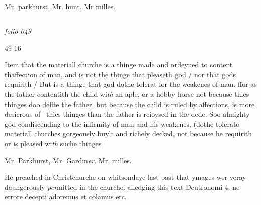 \documentclass[12pt, a4paper]{book}
\begin{document}
               		
				\marginpar[\vspace{0.5cm}{\textcolor{Gray}{n}}]{}
			
               		
		\ifthenelse{\isodd{\thepage}}
		{\reversemarginpar}
		{\normalmarginpar}
		Mr. parkhurst. Mr. hunt. Mr milles.



\dotfill
						\newpage {} \subsection*{}

\textit{folio 049}


\begin{flushright}{\color{Mahogany}49} 16\end{flushright}
	
		
				\marginpar[\vspace{0.5cm}{\textcolor{Gray}{seditious}}]{}
			
		
		\ifthenelse{\isodd{\thepage}}
		{\reversemarginpar}
		{\normalmarginpar}
		Item that the materiall churche is a thinge made
 and ordeyned to content thaffection of man, and is
 not the thinge that pleaseth god / nor that gods
 requirith / But is a thinge that god dothe tolerat
 for the weakenes of man. ffor as the father contentith
 the child wi\textit{th }an aple, or a hobby horse not because
 thies thinges doo delite the father. but because the
 child is ruled by affections, is more desierous of 
 thies thinges than the father is reioysed in the
 dede. Soo almighty god condiscending to the
 infirmity of man and his weakenes, (dothe
 tolerate materiall churches gorgeously buylt
 and richely decked, not because he requirith
 or is pleased wi\textit{th} suche thinges
	

	
				\marginpar[\vspace{0.5cm}{\textcolor{Gray}{+}}]{}
			
	
		\ifthenelse{\isodd{\thepage}}
		{\reversemarginpar}
		{\normalmarginpar}
		Mr. Parkhurst, Mr. Gardin\textit{er}. Mr. milles.

	
				\marginpar[\vspace{0.5cm}{\textcolor{Gray}{Images}}]{}
			
	
		\ifthenelse{\isodd{\thepage}}
		{\reversemarginpar}
		{\normalmarginpar}
		He preached in Christchurche on whitsondaye
 last past that ymages wer veray daungerously
 \textit{per}mitted in the churche. alledging this text
 Deutronomi 4. ne errore decepti adoremus
 et colamus etc.
			
\end{document}
